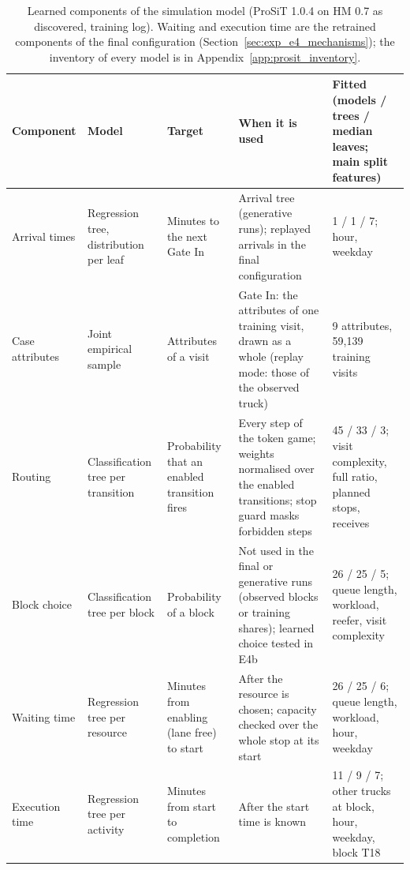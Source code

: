 \begin{table}[htbp]
\centering
\scriptsize
\begin{tabularx}{\textwidth}{L{1.7cm}L{2.2cm}L{2.3cm}YL{2.6cm}}
\toprule
\textbf{Component} & \textbf{Model} & \textbf{Target} & \textbf{When it is used} & \textbf{Fitted (models / trees / median leaves; main split features)} \\
\midrule
Arrival times & Regression tree, distribution per leaf & Minutes to the next Gate In & Arrival tree (generative runs); replayed arrivals in the final configuration & 1 / 1 / 7; hour, weekday \\
Case attributes & Joint empirical sample & Attributes of a visit & Gate In: the attributes of one training visit, drawn as a whole (replay mode: those of the observed truck) & 9 attributes, 59,139 training visits \\
Routing & Classification tree per transition & Probability that an enabled transition fires & Every step of the token game; weights normalised over the enabled transitions; stop guard masks forbidden steps & 45 / 33 / 3; visit complexity, full ratio, planned stops, receives \\
Block choice & Classification tree per block & Probability of a block & Not used in the final or generative runs (observed blocks or training shares); learned choice tested in E4b & 26 / 25 / 5; queue length, workload, reefer, visit complexity \\
Waiting time & Regression tree per resource & Minutes from enabling (lane free) to start & After the resource is chosen; capacity checked over the whole stop at its start & 26 / 25 / 6; queue length, workload, hour, weekday \\
Execution time & Regression tree per activity & Minutes from start to completion & After the start time is known & 11 / 9 / 7; other trucks at block, hour, weekday, block T18 \\
\bottomrule
\end{tabularx}
\caption{Learned components of the simulation model (ProSiT 1.0.4 on HM 0.7 as discovered, training log). Waiting and execution time are the retrained components of the final configuration (Section~\ref{sec:exp_e4_mechanisms}); the inventory of every model is in Appendix~\ref{app:prosit_inventory}.}
\label{tab:sim_components}
\end{table}
